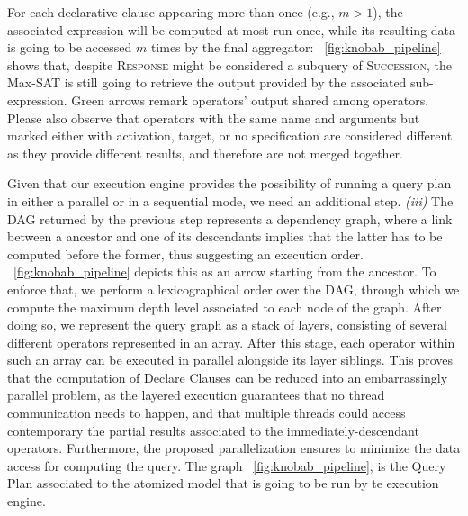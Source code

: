 For each declarative clause appearing more than once (e.g., $m>1$), the associated \xLTLf expression will be computed at most run once, while its resulting data is going to be accessed $m$ times by the final aggregator: \figurename~\ref{fig:knobab_pipeline} shows that, despite \textsc{Response} might be considered a subquery of \textsc{Succession}, the Max-SAT is still going to retrieve the output provided by the associated sub-expression. Green arrows remark operators' output shared among operators. Please also observe that operators with the same name and arguments but marked either with activation, target, or no specification are considered different as they provide different results, and therefore are not merged together. %

Given that our execution engine provides the possibility of running a query plan in either a parallel or in a sequential mode, we need   an additional step. \textit{(iii)} The DAG returned by the previous step represents a dependency graph, where a link between a ancestor and one of its descendants implies that the latter has to be computed before the former, thus suggesting an execution order. \figurename~\ref{fig:knobab_pipeline} depicts this as an arrow starting from the ancestor. To enforce that, we perform a lexicographical order over the DAG, through which we compute the maximum depth level associated to each node of the graph. After doing so, we represent the query graph as a stack of layers, consisting of several different operators represented in an array. After this stage, each operator within such an array can be executed in parallel alongside its layer siblings. This proves that the computation of Declare Clauses can be reduced into an embarrassingly parallel problem, as the layered execution guarantees that no thread communication needs to happen, and that multiple threads could access contemporary the partial results associated to the immediately-descendant operators. Furthermore, the proposed parallelization ensures to minimize the data access for computing the query. The graph \figurename~\ref{fig:knobab_pipeline}, is the Query Plan associated to the atomized model that is going to be run by te execution engine.
